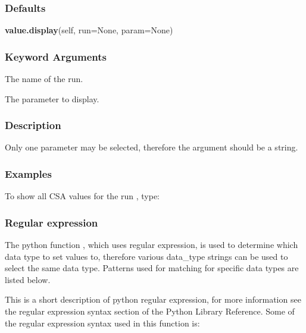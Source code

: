 \subsubsection{Defaults}

\textsf{\textbf{value.display}(self, run=None, param=None)}


\subsubsection{Keyword Arguments}

  The name of the run. 

  The parameter to display. 




\subsubsection{Description}

Only one parameter may be selected, therefore the  argument should be a string.



\subsubsection{Examples}

To show all CSA values for the run , type:




\subsubsection{Regular expression}

The python function , which uses regular expression, is used to determine which data type to set values to, therefore various data\_type strings can be used to select the same data type.  Patterns used for matching for specific data types are listed below.


This is a short description of python regular expression, for more information see the regular expression syntax section of the Python Library Reference.  Some of the regular expression syntax used in this function is:


